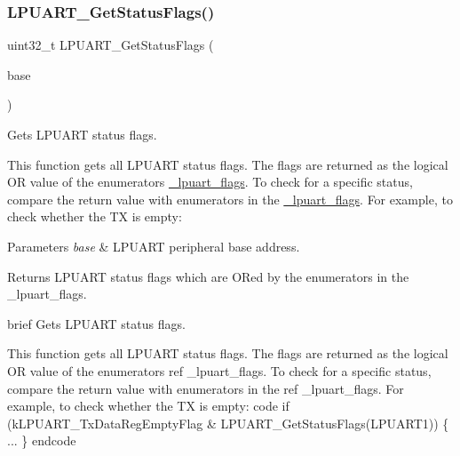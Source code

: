 \subsubsection{\texorpdfstring{LPUART\_GetStatusFlags()}{LPUART\_GetStatusFlags()}}
{\footnotesize\ttfamily uint32\+\_\+t L\+P\+U\+A\+R\+T\+\_\+\+Get\+Status\+Flags (\begin{DoxyParamCaption}\item[{\mbox{\hyperlink{struct_l_p_u_a_r_t___type}{L\+P\+U\+A\+R\+T\+\_\+\+Type}} $\ast$}]{base }\end{DoxyParamCaption})}



Gets L\+P\+U\+A\+RT status flags. 

This function gets all L\+P\+U\+A\+RT status flags. The flags are returned as the logical OR value of the enumerators \mbox{\hyperlink{group__lpuart__driver_ga24bb7ca3f894fe5ff55b9f38bec16c89}{\+\_\+lpuart\+\_\+flags}}. To check for a specific status, compare the return value with enumerators in the \mbox{\hyperlink{group__lpuart__driver_ga24bb7ca3f894fe5ff55b9f38bec16c89}{\+\_\+lpuart\+\_\+flags}}. For example, to check whether the TX is empty\+: 
\begin{DoxyCode}{0}
\DoxyCodeLine{\{}
\DoxyCodeLine{\}}
\end{DoxyCode}



\begin{DoxyParams}{Parameters}
{\em base} & L\+P\+U\+A\+RT peripheral base address. \\
\hline
\end{DoxyParams}
\begin{DoxyReturn}{Returns}
L\+P\+U\+A\+RT status flags which are O\+Red by the enumerators in the \+\_\+lpuart\+\_\+flags.
\end{DoxyReturn}
brief Gets L\+P\+U\+A\+RT status flags.

This function gets all L\+P\+U\+A\+RT status flags. The flags are returned as the logical OR value of the enumerators ref \+\_\+lpuart\+\_\+flags. To check for a specific status, compare the return value with enumerators in the ref \+\_\+lpuart\+\_\+flags. For example, to check whether the TX is empty\+: code if (k\+L\+P\+U\+A\+R\+T\+\_\+\+Tx\+Data\+Reg\+Empty\+Flag \& L\+P\+U\+A\+R\+T\+\_\+\+Get\+Status\+Flags(\+L\+P\+U\+A\+R\+T1)) \{ ... \} endcode

